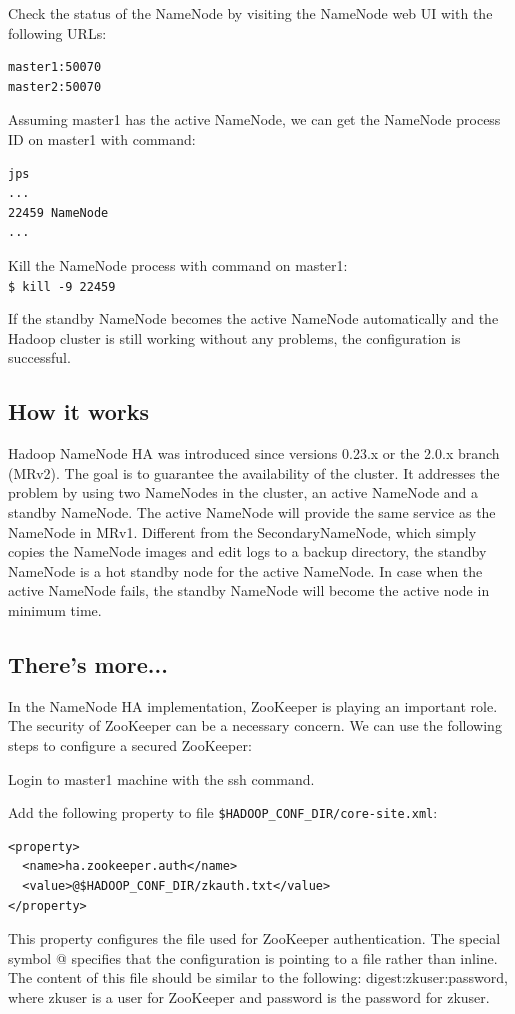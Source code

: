 Check the status of the NameNode by visiting the NameNode web UI with the following URLs:
\begin{verbatim}
master1:50070
master2:50070
\end{verbatim}

Assuming master1 has the active NameNode, we can get the NameNode process ID on master1 with command:
\begin{verbatim}
jps
...
22459 NameNode
...
\end{verbatim}

Kill the NameNode process with command on master1: \\
\verb|$ kill -9 22459|

If the standby NameNode becomes the active NameNode automatically and the Hadoop cluster is still working without any problems, the configuration is successful.

\subsection*{How it works}
Hadoop NameNode HA was introduced since versions 0.23.x or the 2.0.x branch (MRv2). The goal is to guarantee the availability of the cluster. It addresses the problem by using two NameNodes in the cluster, an active NameNode and a standby NameNode. The active NameNode will provide the same service as the NameNode in MRv1. Different from the SecondaryNameNode, which simply copies the NameNode images and edit logs to a backup directory, the standby NameNode is a hot standby node for the active NameNode. In case when the active NameNode fails, the standby NameNode will become the active node in minimum time.
\subsection*{There's more...}
In the NameNode HA implementation, ZooKeeper is playing an important role. The security of ZooKeeper can be a necessary concern. We can use the following steps to configure a secured ZooKeeper:

Login to master1 machine with the ssh command.

Add the following property to file \verb|$HADOOP_CONF_DIR/core-site.xml|:
\lstset{style=bashstyle}
\begin{lstlisting}
<property>
  <name>ha.zookeeper.auth</name>
  <value>@$HADOOP_CONF_DIR/zkauth.txt</value>
</property>
\end{lstlisting}

This property configures the file used for ZooKeeper authentication. The special symbol @ specifies that the configuration is pointing to a file rather than inline. The content of this file should be similar to the following: digest:zkuser:password, where zkuser is a user for ZooKeeper and password is the password for zkuser.


